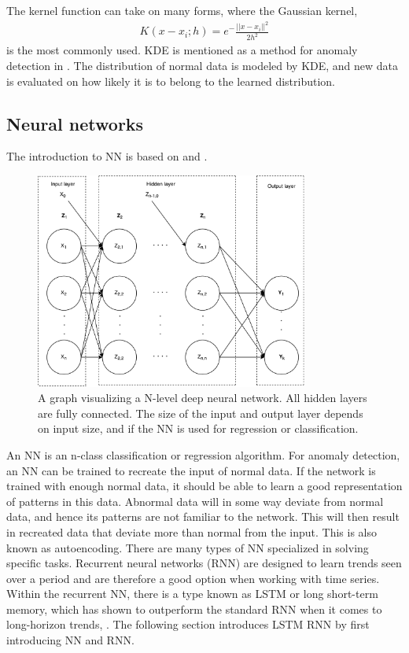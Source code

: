        The kernel function can take on many forms, where the Gaussian kernel,
        \begin{align}
            K(x-x_i;h) = e^-\frac{||x-x_i||^2}{2h^2}
        \end{align}
        is the most commonly used. KDE is mentioned as a method for anomaly detection in \cite{Pimentel2014}. The distribution of normal data is modeled by KDE, and new data is evaluated on how likely it is to belong to the learned distribution.
        

    \subsection{Neural networks}
        The introduction to NN is based on \cite{Aasnes2017} and \cite{Hastie}. 
        \begin{figure}[h]
            \centering
            \includegraphics[width=0.8\textwidth]{report/figures/techniques/neural_network.pdf}
            \caption{A graph visualizing a N-level deep neural network. All hidden layers are fully connected. The size of the input and output layer depends on input size, and if the NN is used for regression or classification.}
            \label{fig:nn_fullnetwork}
        \end{figure}
        
        An NN is an n-class classification or regression algorithm. For anomaly detection, an NN can be trained to recreate the input of normal data. If the network is trained with enough normal data, it should be able to learn a good representation of patterns in this data. Abnormal data will in some way deviate from normal data, and hence its patterns are not familiar to the network. This will then result in recreated data that deviate more than normal from the input. This is also known as autoencoding. There are many types of NN specialized in solving specific tasks. Recurrent neural networks (RNN) are designed to learn trends seen over a period and are therefore a good option when working with time series. Within the recurrent NN, there is a type known as LSTM or long short-term memory, which has shown to outperform the standard RNN when it comes to long-horizon trends, \cite{Goodfellow-et-al-201}. The following section introduces LSTM RNN by first introducing NN and RNN.  
        

